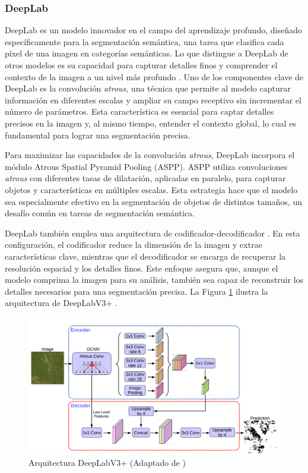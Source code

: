 \subsubsection{DeepLab}

DeepLab es un modelo innovador en el campo del aprendizaje profundo, diseñado específicamente para la segmentación semántica, una tarea que clasifica cada píxel de una imagen en categorías semánticas. Lo que distingue a DeepLab de otros modelos es su capacidad para capturar detalles finos y comprender el contexto de la imagen a un nivel más profundo \cite{chen2016}. Uno de los componentes clave de DeepLab \cite{chen2017} es la convolución \textit{atrous}, una técnica que permite al modelo capturar información en diferentes escalas y ampliar su campo receptivo sin incrementar el número de parámetros. Esta característica es esencial para captar detalles precisos en la imagen y, al mismo tiempo, entender el contexto global, lo cual es fundamental para lograr una segmentación precisa.

Para maximizar las capacidades de la convolución \textit{atrous}, DeepLab incorpora el módulo Atrous Spatial Pyramid Pooling (ASPP). ASPP utiliza convoluciones \textit{atrous} con diferentes tasas de dilatación, aplicadas en paralelo, para capturar objetos y características en múltiples escalas. Esta estrategia hace que el modelo sea especialmente efectivo en la segmentación de objetos de distintos tamaños, un desafío común en tareas de segmentación semántica. 

DeepLab también emplea una arquitectura de codificador-decodificador \cite{chen2016}. En esta configuración, el codificador reduce la dimensión de la imagen y extrae características clave, mientras que el decodificador se encarga de recuperar la resolución espacial y los detalles finos. Este enfoque asegura que, aunque el modelo comprima la imagen para su análisis, también sea capaz de reconstruir los detalles necesarios para una segmentación precisa. La Figura \ref{fig:model} ilustra la arquitectura de DeepLabV3+ \cite{chen2018}.

\begin{figure}[t]
 \centering
 \includegraphics[width=\columnwidth]{model}
 \caption{Arquitectura DeepLabV3+ (Adaptado de \cite{chen2018})}
 \label{fig:model}
\end{figure}


